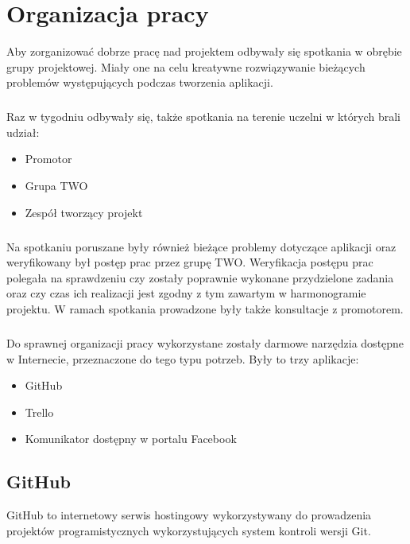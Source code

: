 \chapter{Organizacja pracy}



Aby zorganizować dobrze pracę nad projektem odbywały się spotkania w obrębie grupy projektowej. Miały one na celu kreatywne rozwiązywanie bieżących problemów występujących podczas tworzenia aplikacji. 
\paragraph{}
Raz w tygodniu odbywały się, także spotkania na terenie uczelni w których brali udział:
\begin{itemize}
\item Promotor
\item Grupa TWO
\item Zespół tworzący projekt
\end{itemize}

\paragraph{}
Na spotkaniu poruszane były również bieżące problemy dotyczące aplikacji oraz weryfikowany był postęp prac przez grupę TWO. Weryfikacja postępu prac polegała na sprawdzeniu czy zostały poprawnie wykonane przydzielone zadania oraz czy czas ich realizacji jest zgodny z tym zawartym w harmonogramie projektu. W ramach spotkania prowadzone były także konsultacje z promotorem.
\paragraph{}
Do sprawnej organizacji pracy wykorzystane zostały darmowe narzędzia dostępne w Internecie, przeznaczone do tego typu potrzeb. Były to trzy aplikacje:
\begin{itemize}
\item GitHub
\item Trello
\item Komunikator dostępny w portalu Facebook
\end{itemize}

\section{GitHub}
GitHub to internetowy serwis hostingowy wykorzystywany do prowadzenia projektów programistycznych wykorzystujących system kontroli wersji Git. 
